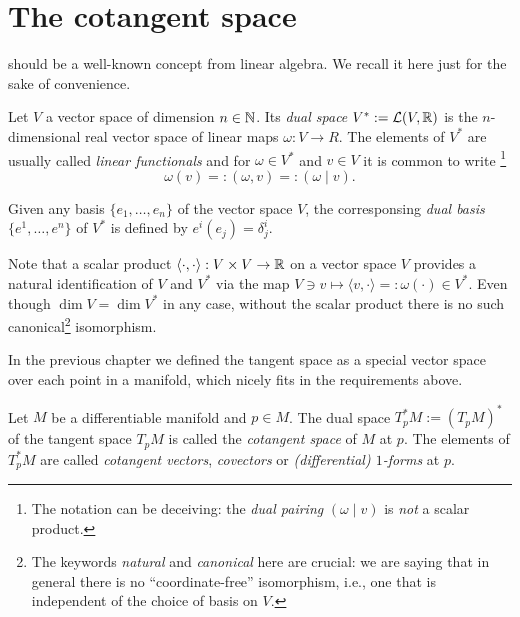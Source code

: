 \section{The cotangent space}

 should be a well-known concept from linear algebra. We recall it here just for the sake of convenience.

\begin{definition}
  Let $V$ a vector space of dimension $n\in \mathbb{N}$.
  Its \emph{dual space} $V^* := \mathcal{L}(V, \mathbb{R})$ is the $n$-dimensional real vector space of linear maps $\omega:V \to R$.
  The elements of $V^*$ are usually called \emph{linear functionals} and for $\omega\in V^*$ and $v\in V$ it is common to write
  \footnote{The notation can be deceiving: the \emph{dual pairing} $(\omega \mid v)$ is \emph{not} a scalar product.}
  \begin{equation}
    \omega(v) =: (\omega, v) =: (\omega \mid v).
  \end{equation}

  Given any basis $\{e_1, \ldots, e_n\}$ of the vector space $V$, the corresponsing \emph{dual basis} $\{e^1, \ldots, e^n\}$ of $V^*$ is defined by $e^i(e_j) = \delta^i_j$.
\end{definition}

\begin{remark}\label{rmk:identification}
  Note that a scalar product $\langle\cdot, \cdot\rangle :  V\times V \to \mathbb{R}$ on a vector space $V$ provides a natural identification of $V$ and $V^*$ via the map $V\ni v \mapsto \langle v, \cdot \rangle =: \omega(\cdot) \in V^*$.
  Even though $\dim V = \dim V^*$ in any case, without the scalar product there is no such canonical\footnote{The keywords \emph{natural} and \emph{canonical} here are crucial: we are saying that in general there is no ``coordinate-free'' isomorphism, i.e., one that is independent of the choice of basis on $V$.} isomorphism.
\end{remark}

In the previous chapter we defined the tangent space as a special vector space over each point in a manifold, which nicely fits in the requirements above.

\begin{definition}
  Let $M$ be a differentiable manifold and $p\in M$.
  The dual space $T_p^*M := (T_pM)^*$ of the tangent space $T_pM$ is called the \emph{cotangent space} of $M$ at $p$.
  The elements of $T^*_pM$ are called \emph{cotangent vectors}, \emph{covectors} or \emph{(differential) $1$-forms} at $p$.
\end{definition}

